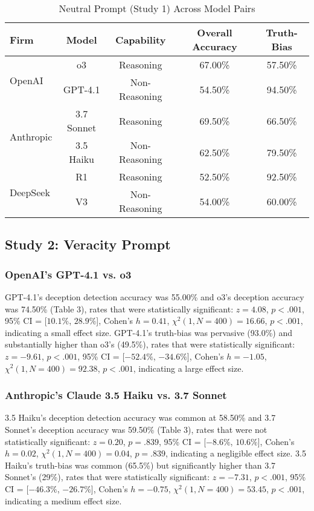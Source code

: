 \documentclass{article}
\begin{document}
\begin{table}[ht]
\centering
\caption{Neutral Prompt (Study 1) Across Model Pairs}
\begin{tabular}{lcccc}
\toprule
\textbf{Firm} & \textbf{Model} & \textbf{Capability} & \textbf{Overall Accuracy} & \textbf{Truth-Bias} \\
\midrule
\multirow{2}{*}{OpenAI} & o3 & Reasoning & 67.00\% & 57.50\%  \\
& GPT-4.1 & Non-Reasoning & 54.50\% & 94.50\% \\
\midrule
\multirow{2}{*}{Anthropic} & 3.7 Sonnet & Reasoning & 69.50\% & 66.50\% \\
& 3.5 Haiku & Non-Reasoning & 62.50\% & 79.50\% \\
\midrule
\multirow{2}{*}{DeepSeek} & R1 & Reasoning & 52.50\% & 92.50\% \\
& V3 & Non-Reasoning & 54.00\% & 60.00\% \\
\bottomrule
\end{tabular}
\label{tab:study1_model_comparison}
\end{table}

\subsection{Study 2: Veracity Prompt}

\subsubsection{OpenAI's GPT-4.1 vs. o3}

GPT-4.1's deception detection accuracy was 55.00\% and o3's deception accuracy was 74.50\% (Table 3), rates that were statistically significant:  $z = 4.08$, $p < .001$, 95\% CI = [$10.1\%$, $28.9\%$], Cohen’s $h =0.41$, $\chi^2(1, N = 400) = 16.66$, $p < .001$, indicating a small effect size. GPT-4.1's truth-bias was pervasive (93.0\%) and substantially higher than o3's (49.5\%), rates that were statistically significant: $z = -9.61$, $p < .001$, 95\% CI = [$-52.4\%$, $-34.6\%$], Cohen’s $h = -1.05$, $\chi^2(1, N = 400) = 92.38$, $p < .001$, indicating a large effect size.

\subsubsection{Anthropic's Claude 3.5 Haiku vs. 3.7 Sonnet}

3.5 Haiku's deception detection accuracy was common at 58.50\% and 3.7 Sonnet's deception accuracy was 59.50\% (Table 3), rates that were not statistically significant:  $z = 0.20$, $p = .839$, 95\% CI = [$-8.6\%$, $10.6\%$], Cohen’s $h =0.02$, $\chi^2(1, N = 400) = 0.04$, $p = .839$, indicating a negligible effect size. 3.5 Haiku's truth-bias was common (65.5\%) but significantly higher than 3.7 Sonnet's (29\%), rates that were statistically significant: $z = -7.31$, $p < .001$, 95\% CI = [$-46.3\%$, $-26.7\%$], Cohen’s $h = -0.75$, $\chi^2(1, N = 400) = 53.45$, $p < .001$, indicating a medium effect size.
\end{document}
